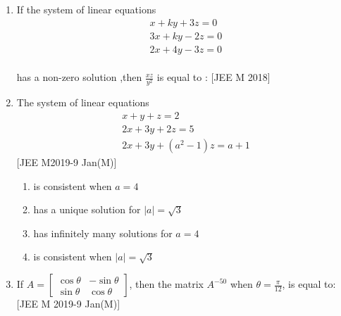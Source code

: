 \documentclass[journal,,12pt,twocolumn]{IEEEtran}
\theoremstyle{remark}
\begin{document}
\begin{enumerate}
\begin{enumerate}
\end{enumerate}
\item If the system of linear equations \\
\begin{align*}x+ky+3z=0 \\
3x+ky-2z=0 \\
2x+4y-3z=0 \end{align*}\\
has a non-zero solution ,then $\frac{xz}{y^2}$ is equal to :
\hfill{[JEE M 2018]}
\begin{enumerate}
\end{enumerate}
\item The system of linear equations \\
\begin{align*}x+y+z=2 \\
2x+3y+2z=5 \\
2x+3y+(a^2-1)z=a+1 \end{align*} 
\hfill{[JEE M2019-9 Jan(M)]}
\begin{enumerate}[label=\alph*)]
    \item is consistent when $a=4$
    \item has a unique solution for $|a|= \sqrt{3}$
    \item has infinitely many solutions for $a=4$
    \item is consistent when $|a|= \sqrt{3}$
\end{enumerate}
\item If $A= \begin{bmatrix}
    \cos{\theta} & -\sin{\theta} \\
    \sin{\theta} & \cos{\theta}
\end{bmatrix}$, then the matrix $A^{-50}$ when $\theta=\frac{\pi}{12}$, is equal to: 
\hfill{[JEE M 2019-9 Jan(M)]}
\begin{enumerate}
\end{enumerate}
\end{enumerate}
\end{document}
